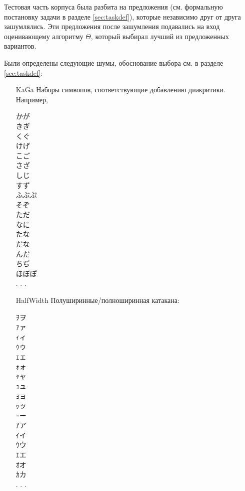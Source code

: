 Тестовая часть корпуса была разбита на предложения (см. формальную постановку задачи в разделе \cref{sec:taskdef}), которые независимо друг от друга зашумлялись. Эти предложения после зашумления подавались на вход оценивающему алгоритму $\Theta$, который выбирал лучший из предложенных вариантов.

Были определены следующие шумы, обоснование выбора см. в разделе \cref{sec:taskdef}: 

\begin{itemize}
	\item[KaGa] Наборы симвопов, соответствующие добавлению диакритики. Например,
	
	\begin{multicols}{3}
		\begin{CJK}{UTF8}{min}
			かが \\
			きぎ \\
			くぐ \\
			けげ \\
			こご \\
			さざ \\
			しじ \\
			すず \\
			ふぶぷ   \\
			そぞ \\
			ただ \\
			なに \\
			たな \\
			だな \\
			んだ \\
			ちぢ \\
		ほぼぽ \\
	. . .\end{CJK}
	\end{multicols}
	
	\item[HalfWidth] Полуширинные/полноширинная катакана:
	
		\begin{multicols}{3}
		\begin{CJK}{UTF8}{min}
				ｦヲ\\
			ｧァ\\
			ｨィ\\
			ｩゥ\\
			ｪェ\\
			ｫォ\\
			ｬャ\\
			ｭュ\\
			ｮョ\\
			ｯッ\\
			ｰー\\
			ｱア\\
			ｲイ\\
			ｳウ\\
			ｴエ\\
			ｵオ\\
			ｶカ\\
			. . .  \end{CJK}
	\end{multicols}
	



\end{itemize}

